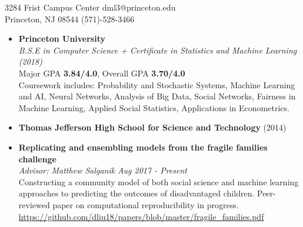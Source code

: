 \documentclass[margin]{res}
\begin{document}
 


\begin{resume} 
\hspace*{-\hoffset} 3284 Frist Campus Center \hfill dml3@princeton.edu \\
\hspace*{-\hoffset} Princeton, NJ 08544 \hfill (571)-528-3466 \\ 

 

\begin{itemize}
\section{Education} 

\item
\textbf{Princeton University\\}
\emph{B.S.E in Computer Science + Certificate in Statistics and Machine Learning (2018)} \\
Major GPA \textbf{3.84/4.0}, Overall GPA \textbf{3.70/4.0}\\
Coursework includes: Probability and Stochastic Systems, Machine Learning and AI, Neural Networks, Analysis of Big Data, Social Networks, Fairness in Machine Learning, Applied Social Statistics, Applications in Econometrics.
\item
\textbf{Thomas Jefferson High School for Science and Technology} (2014)
\end{itemize}

\begin{itemize} \itemsep -1pt  %
\section{Projects}
\item 
{\bf Replicating and ensembling models from the fragile families challenge} \\
\emph{Advisor: Matthew Salganik} \emph{Aug 2017  - Present }\\
Constructing a community model of both social science and machine learning approaches to predicting the outcomes of disadvantaged children. Peer-reviewed paper on computational reproducibility in progress. \\
\url{https://github.com/dliu18/papers/blob/master/fragile_families.pdf} \\


\end{itemize}
\end{resume}
\end{document}
